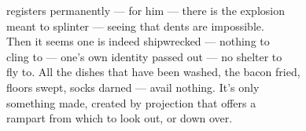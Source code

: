 \documentclass[11pt,a4paper]{article}
\begin{document}
{registers permanently --- for him --- there is the explosion \\
meant to splinter --- seeing that dents are impossible. \\
Then it seems one is indeed shipwrecked --- nothing to \\
cling to --- one's own identity passed out --- no shelter to \\
fly to. All the dishes that have been washed, the bacon fried, \\
floors swept, socks darned --- avail nothing. It's only \\
something made, created by projection that offers a \\
rampart from which to look  out, or down over.}






\end{document}
